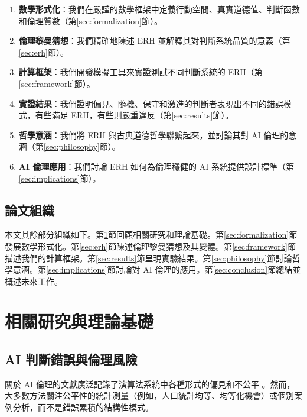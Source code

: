 \documentclass[12pt,a4paper]{article}
\theoremstyle{definition}
\theoremstyle{remark}
\begin{document}
\begin{enumerate}
    \item \textbf{數學形式化}：我們在嚴謹的數學框架中定義行動空間、真實道德值、判斷函數和倫理質數（第\ref{sec:formalization}節）。
    
    \item \textbf{倫理黎曼猜想}：我們精確地陳述 ERH 並解釋其對判斷系統品質的意義（第\ref{sec:erh}節）。
    
    \item \textbf{計算框架}：我們開發模擬工具來實證測試不同判斷系統的 ERH（第\ref{sec:framework}節）。
    
    \item \textbf{實證結果}：我們證明偏見、隨機、保守和激進的判斷者表現出不同的錯誤模式，有些滿足 ERH，有些則嚴重違反（第\ref{sec:results}節）。
    
    \item \textbf{哲學意涵}：我們將 ERH 與古典道德哲學聯繫起來，並討論其對 AI 倫理的意涵（第\ref{sec:philosophy}節）。
    
    \item \textbf{AI 倫理應用}：我們討論 ERH 如何為倫理穩健的 AI 系統提供設計標準（第\ref{sec:implications}節）。
\end{enumerate}

\subsection{論文組織}

本文其餘部分組織如下。第\ref{sec:related}節回顧相關研究和理論基礎。第\ref{sec:formalization}節發展數學形式化。第\ref{sec:erh}節陳述倫理黎曼猜想及其變體。第\ref{sec:framework}節描述我們的計算框架。第\ref{sec:results}節呈現實驗結果。第\ref{sec:philosophy}節討論哲學意涵。第\ref{sec:implications}節討論對 AI 倫理的應用。第\ref{sec:conclusion}節總結並概述未來工作。

\section{相關研究與理論基礎}
\label{sec:related}

\subsection{AI 判斷錯誤與倫理風險}

關於 AI 倫理的文獻廣泛記錄了演算法系統中各種形式的偏見和不公平 \citep{mehrabi2021,barocas2016,oneil2016}。然而，大多數方法關注公平性的統計測量（例如，人口統計均等、均等化機會）或個別案例分析，而不是錯誤累積的結構性模式。
\end{document}
